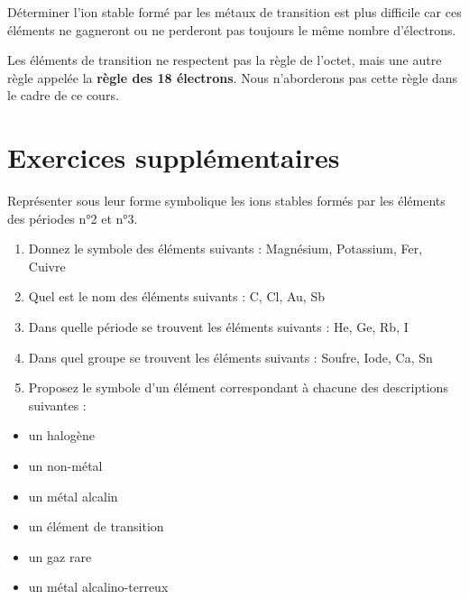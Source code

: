 \documentclass[
  11pt,
  a4paper,
  openany]{book}
\providecommand{\tightlist}{%
  \setlength{\itemsep}{0pt}\setlength{\parskip}{0pt}}
\begin{document}
Déterminer l'ion stable formé par les métaux de transition est plus difficile car ces éléments ne gagneront ou ne perderont pas toujours le même nombre d'électrons.

Les éléments de transition ne respectent pas la règle de l'octet, mais une autre règle appelée la \textbf{règle des 18 électrons}. Nous n'aborderons pas cette règle dans le cadre de ce cours.

\newpage

\hypertarget{exercices-suppluxe9mentaires-4}{%
\section{Exercices supplémentaires}\label{exercices-suppluxe9mentaires-4}}

\begin{Exercise}

Représenter sous leur forme symbolique les ions stables formés par les éléments des périodes n°2 et n°3.

\begin{enumerate}
\def\labelenumi{\arabic{enumi}.}
\tightlist
\item
  Donnez le symbole des éléments suivants :
  Magnésium, Potassium, Fer, Cuivre\\
\item
  Quel est le nom des éléments suivants :
  C, Cl, Au, Sb\\
\item
  Dans quelle période se trouvent les éléments suivants :
  He, Ge, Rb, I\\
\item
  Dans quel groupe se trouvent les éléments suivants :
  Soufre, Iode, Ca, Sn\\
\item
  Proposez le symbole d'un élément correspondant à chacune des descriptions suivantes :
\end{enumerate}

\begin{itemize}
\tightlist
\item
  un halogène
\item
  un non-métal
\item
  un métal alcalin
\item
  un élément de transition
\item
  un gaz rare
\item
  un métal alcalino-terreux
\end{itemize}

\end{Exercise}
\end{document}
